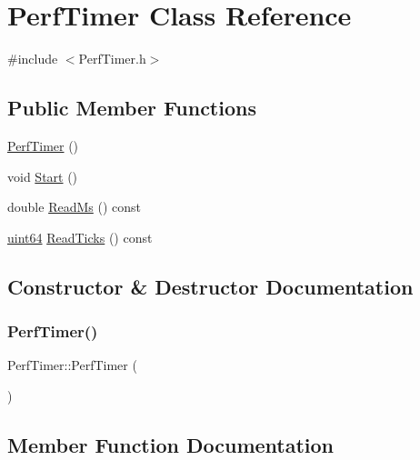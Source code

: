 \hypertarget{class_perf_timer}{}\section{Perf\+Timer Class Reference}
\label{class_perf_timer}


{\ttfamily \#include $<$Perf\+Timer.\+h$>$}

\subsection*{Public Member Functions}
\begin{DoxyCompactItemize}
\item 
\mbox{\hyperlink{class_perf_timer_a73d9eb85b4ef3955f61435355181b0a0}{Perf\+Timer}} ()
\item 
void \mbox{\hyperlink{class_perf_timer_a2f429d6c4b576d41194b072dbe3c13e1}{Start}} ()
\item 
double \mbox{\hyperlink{class_perf_timer_aa1bdcd4abb2aac536556c497f44b37eb}{Read\+Ms}} () const
\item 
\mbox{\hyperlink{_defs_8h_ac6afe794ed283c11fb63426a58188e5e}{uint64}} \mbox{\hyperlink{class_perf_timer_ab304eb5e12e6d7ed137953c3a8914e13}{Read\+Ticks}} () const
\end{DoxyCompactItemize}


\subsection{Constructor \& Destructor Documentation}
\mbox{\label{class_perf_timer_a73d9eb85b4ef3955f61435355181b0a0}} 
\subsubsection{\texorpdfstring{PerfTimer()}{PerfTimer()}}
{\footnotesize\ttfamily Perf\+Timer\+::\+Perf\+Timer (\begin{DoxyParamCaption}{ }\end{DoxyParamCaption})}



\subsection{Member Function Documentation}
\mbox{\label{class_perf_timer_aa1bdcd4abb2aac536556c497f44b37eb}} 
